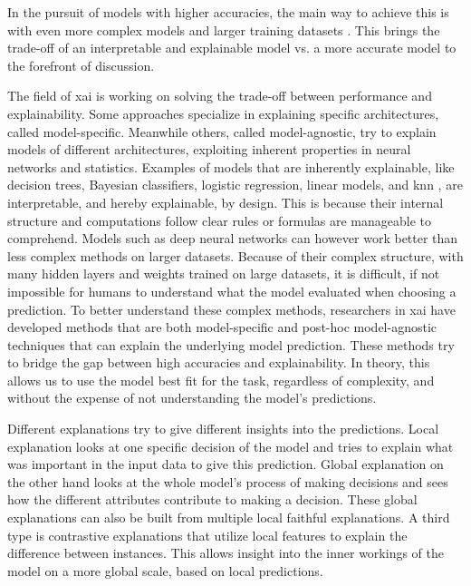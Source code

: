 In the pursuit of models with higher accuracies, the main way to achieve this is with even more complex models and larger training datasets \cite{bianchiniComplexityNeuralNetwork2014}. This brings the trade-off of an interpretable and explainable model vs. a more accurate model \cite{barredoarrietaExplainableArtificialIntelligence2020} to the forefront of discussion. 


The field of \gls{xai} is working on solving the trade-off between performance and explainability. Some approaches specialize in explaining specific architectures, called model-specific. Meanwhile others, called model-agnostic, try to explain models of different architectures, exploiting inherent properties in neural networks and statistics. Examples of models that are inherently explainable, like decision trees, Bayesian classifiers, logistic regression, linear models, and \gls{knn} \cite{fixDiscriminatoryAnalysisNonparametric1989, coverNearestNeighborPattern1967}, are interpretable, and hereby explainable, by design. This is because their internal structure and computations follow clear rules or formulas are manageable to comprehend.
Models such as deep neural networks can however work better than less complex methods on larger datasets. Because of their complex structure, with many hidden layers and weights trained on large datasets, it is difficult, if not impossible for humans to understand what the model evaluated when choosing a prediction. To better understand these complex methods, researchers in \gls{xai} have developed methods that are both model-specific and post-hoc model-agnostic techniques that can explain the underlying model prediction. These methods try to bridge the gap between high accuracies and explainability.
In theory, this allows us to use the model best fit for the task, regardless of complexity, and without the expense of not understanding the model's predictions. 

Different explanations try to give different insights into the predictions. Local explanation looks at one specific decision of the model and tries to explain what was important in the input data to give this prediction. Global explanation on the other hand looks at the whole model's process of making decisions and sees how the different attributes contribute to making a decision. These global explanations can also be built from multiple local faithful explanations. A third type is contrastive explanations that utilize local features to explain the difference between instances. This allows insight into the inner workings of the model on a more global scale, based on local predictions.

